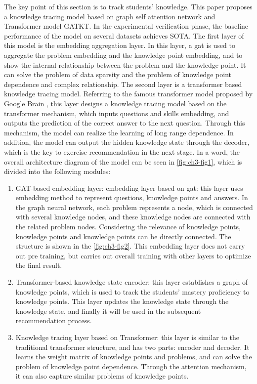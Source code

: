 The key point of this section is to track students' knowledge. This paper proposes a knowledge tracing model based on graph self attention network and Transformer model GATKT. In the experimental verification phase, the baseline performance of the model on several datasets achieves SOTA. The first layer of this model is the embedding aggregation layer. In this layer, a gat is used to aggregate the problem embedding and the knowledge point embedding, and to show the internal relationship between the problem and the knowledge point. It can solve the problem of data sparsity and the problem of knowledge point dependence and complex relationship. The second layer is a transformer based knowledge tracing model. Referring to the famous transformer model proposed by Google Brain \cite{vaswani2017attention}, this layer designs a knowledge tracing model based on the transformer mechanism, which inputs questions and skills embedding, and outputs the prediction of the correct answer to the next question. Through this mechanism, the model can realize the learning of long range dependence. In addition, the model can output the hidden knowledge state through the decoder, which is the key to exercise recommendation in the next stage. In a word, the overall architecture diagram of the model can be seen in \figurename{\ref{fig:ch3-fig1}}, which is divided into the following modules:
\begin{enumerate}
	\item GAT-based embedding layer: embedding layer based on gat: this layer uses embedding method to represent questions, knowledge points and answers. In the graph neural network, each problem represents a node, which is connected with several knowledge nodes, and these knowledge nodes are connected with the related problem nodes. Considering the relevance of knowledge points, knowledge points and knowledge points can be directly connected. The structure is shown in the \figurename{\ref{fig:ch3-fig2}}. This embedding layer does not carry out pre training, but carries out overall training with other layers to optimize the final result.
	\item Transformer-based knowledge state encoder: this layer establishes a graph of knowledge points, which is used to track the students' mastery proficiency to knowledge points. This layer updates the knowledge state through the knowledge state, and finally it will be used in the subsequent recommendation process.
	\item Knowledge tracing layer based on Transformer: this layer is similar to the traditional transformer structure, and has two parts: encoder and decoder. It learns the weight matrix of knowledge points and problems, and can solve the problem of knowledge point dependence. Through the attention mechanism, it can also capture similar problems of knowledge points.
\end{enumerate}

